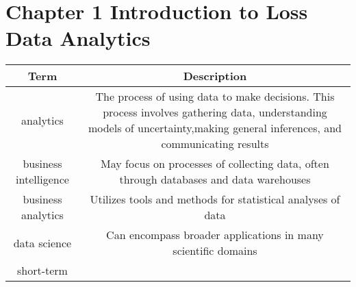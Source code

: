 \documentclass[]{book}
\theoremstyle{definition}
\theoremstyle{definition}
\theoremstyle{definition}
\theoremstyle{remark}
\begin{document}
\section{Chapter 1 Introduction to Loss Data
Analytics}\label{chapter-1-introduction-to-loss-data-analytics}

\begin{longtable}[]{@{}cc@{}}
\toprule
\begin{minipage}[b]{0.41\columnwidth}\centering\strut
Term\strut
\end{minipage} & \begin{minipage}[b]{0.42\columnwidth}\centering\strut
Description\strut
\end{minipage}\tabularnewline
\midrule
\endhead
\begin{minipage}[t]{0.41\columnwidth}\centering\strut
analytics\strut
\end{minipage} & \begin{minipage}[t]{0.42\columnwidth}\centering\strut
The process of using data to make decisions. This process involves
gathering data, understanding models of uncertainty,making general
inferences, and communicating results\strut
\end{minipage}\tabularnewline
\begin{minipage}[t]{0.41\columnwidth}\centering\strut
business intelligence\strut
\end{minipage} & \begin{minipage}[t]{0.42\columnwidth}\centering\strut
May focus on processes of collecting data, often through databases and
data warehouses\strut
\end{minipage}\tabularnewline
\begin{minipage}[t]{0.41\columnwidth}\centering\strut
business analytics\strut
\end{minipage} & \begin{minipage}[t]{0.42\columnwidth}\centering\strut
Utilizes tools and methods for statistical analyses of data\strut
\end{minipage}\tabularnewline
\begin{minipage}[t]{0.41\columnwidth}\centering\strut
data science\strut
\end{minipage} & \begin{minipage}[t]{0.42\columnwidth}\centering\strut
Can encompass broader applications in many scientific domains\strut
\end{minipage}\tabularnewline
\begin{minipage}[t]{0.41\columnwidth}\centering\strut
short-term\strut

\end{minipage}
\end{longtable}
\end{document}
